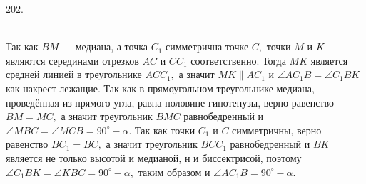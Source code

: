 202. \begin{figure}[ht!]
\end{figure}\\
Так как $BM$ --- медиана, а точка $C_1$ симметрична точке $C,$ точки $M$ и $K$ являются серединами отрезков $AC$ и $CC_1$ соответственно. Тогда $MK$ является средней линией в треугольнике $ACC_1,$ а значит $MK\parallel AC_1$ и $\angle AC_1B=\angle C_1BK$ как накрест лежащие. Так как в прямоугольном треугольнике медиана, проведённая из прямого угла, равна половине гипотенузы, верно равенство $BM=MC,$ а значит треугольник $BMC$ равнобедренный и $\angle MBC=\angle MCB=90^\circ-\alpha.$ Так как точки $C_1$ и $C$ симметричны, верно равенство $BC_1=BC,$ а значит треугольник $BCC_1$ равнобедренный и $BK$ является не только высотой и медианой, н и биссектрисой, поэтому $\angle C_1BK=\angle KBC=90^\circ-\alpha,$ таким образом и $\angle AC_1B=90^\circ-\alpha.$\\
